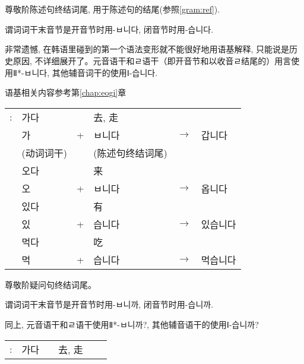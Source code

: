 \section{\kr{}}
\begin{grammar}
    \begin{grammarsect}
        \begin{itemize}
            \item 尊敬阶陈述句终结词尾, 用于陈述句的结尾(参照\ref{gram:ref}).
            \item 谓词词干末音节是开音节时用{\kr -ㅂ니다}, 闭音节时用{\kr -습니다.}
            {\color{gray} \item 非常遗憾, 在韩语里碰到的第一个语法变形就不能很好地用语基解释, 只能说是历史原因, 不详细展开了。元音语干和ㄹ语干（即开音节和以收音ㄹ结尾的）用言使用Ⅱ*{\kr -ㅂ니다}, 其他辅音词干的使用Ⅰ{\kr -습니다.}}语基相关内容参考第\ref{chap:eogi}章
        \end{itemize}
        \begin{tabular}{llllll}
            \kr \ruby{例}{예}:&\kr 가다&&去, 走\\
            &\kr 가&+&\kr ㅂ니다&$\to$&\kr 갑니다\\
            &(动词词干)&&(陈述句终结词尾)\\
            &\kr 오다&&来\\
            &\kr 오&+&\kr ㅂ니다&$\to$&\kr 옵니다\\
            &\kr 있다&&有\\
            &\kr 있&+&\kr 습니다&$\to$&\kr 있습니다\\
            &\kr 먹다&&吃\\
            &\kr 먹&+&\kr 습니다&$\to$&\kr 먹습니다\\
        \end{tabular}
    \end{grammarsect}
    \begin{grammarsect}
        \begin{itemize}
            \item 尊敬阶疑问句终结词尾。
            \item 谓词词干末音节是开音节时用-ㅂ니까, 闭音节时用-습니까.
            {\color{gray} \item 同上, 元音语干和ㄹ语干使用Ⅱ*{\kr -ㅂ니까?}, 其他辅音语干的使用Ⅰ{\kr -습니까?}}
        \end{itemize}
        \begin{tabular}{llllll}
            \kr \ruby{例}{예}:&\kr 가다&&去, 走\\

\end{tabular}
\end{grammarsect}
\end{grammar}
